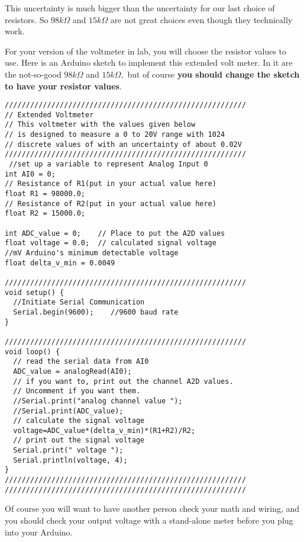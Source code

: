 This uncertainty is much bigger than the uncertainty for our last choice of
resistors. So $98\unit{k%
\Omega%
}$ and $15\unit{k%
\Omega%
}$ are not great choices even though they technically work.

For your version of the voltmeter in lab, you will choose the resistor
values to use. Here is an Arduino sketch to implement this extended volt
meter. In it are the not-so-good $98\unit{k%
\Omega%
}$ and $15\unit{k%
\Omega%
},$ but of course \textbf{you should change the sketch to have your resistor
values}.
\begin{lstlisting}[language=Arduino]
/////////////////////////////////////////////////////////
// Extended Voltmeter
// This voltmeter with the values given below
// is designed to measure a 0 to 20V range with 1024 
// discrete values of with an uncertainty of about 0.02V
/////////////////////////////////////////////////////////
 //set up a variable to represent Analog Input 0
int AI0 = 0;         
// Resistance of R1(put in your actual value here)
float R1 = 98000.0; 
// Resistance of R2(put in your actual value here)  
float R2 = 15000.0;  
 
int ADC_value = 0;    // Place to put the A2D values
float voltage = 0.0;  // calculated signal voltage
//mV Arduino's minimum detectable voltage
float delta_v_min = 0.0049 
 
/////////////////////////////////////////////////////////
void setup() {
  //Initiate Serial Communication
  Serial.begin(9600);    //9600 baud rate
}
 
/////////////////////////////////////////////////////////
void loop() {
  // read the serial data from AI0
  ADC_value = analogRead(AI0);
  // if you want to, print out the channel A2D values. 
  // Uncomment if you want them.
  //Serial.print("analog channel value ");
  //Serial.print(ADC_value);
  // calculate the signal voltage 
  voltage=ADC_value*(delta_v_min)*(R1+R2)/R2;
  // print out the signal voltage
  Serial.print(" voltage ");
  Serial.println(voltage, 4);  
}
/////////////////////////////////////////////////////////
/////////////////////////////////////////////////////////
 \end{lstlisting}

\bigskip Of course you will want to have another person check your math and
wiring, and you should check your output voltage with a stand-alone meter
before you plug into your Arduino.


